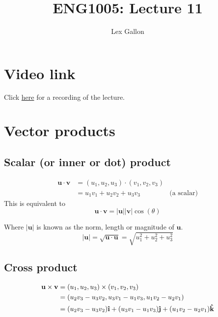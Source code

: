\documentclass[11pt]{article}
\newcommand{\ihat}{\boldsymbol{\hat{\textbf{\i}}}}
\newcommand{\jhat}{\boldsymbol{\hat{\textbf{\j}}}}
\newcommand{\khat}{\boldsymbol{\hat{\textbf{k}}}}
\renewcommand{\vec}[1]{\mathbf{#1}}
\begin{document}
\title{ENG1005: Lecture 11}
\author{Lex Gallon}
\maketitle

\tableofcontents

\section*{Video link}
Click \href{https://echo360.org.au/lesson/G_32340f5d-ff38-43d2-be9d-d88ddb1b3611_b944cecf-8ba5-40d3-a870-0243a0a9e78c_2020-04-08T14:58:00.000_2020-04-08T15:53:00.000/classroom#sortDirection=desc}{here} for a recording of the lecture.

\section{Vector products}
\subsection{Scalar (or inner or dot) product}
\begin{align*}
\vec{u} \cdot \vec{v} &= (u_1, u_2, u_3) \cdot (v_1, v_2, v_3) \\
&= u_1v_1 + u_2v_2 + u_3v_3 & \text{(a scalar)}
\end{align*}
This is equivalent to
\[ \vec{u} \cdot \vec{v} = |\vec{u}||\vec{v}| \cos(\theta) \]

Where $|\vec{u}|$ is known as the norm, length or magnitude of $\vec{u}$.
\[ |\vec{u}| = \sqrt{\vec{u} \cdot \vec{u}} = \sqrt{u_1^2 + u_2^2 + u_3^2} \]

\subsection{Cross product}
\begin{align*}
\vec{u} \times \vec{v} &= (u_1, u_2, u_3) \times (v_1, v_2, v_3) \\
&= (u_2v_3 - u_3v_2, u_3v_1 - u_1v_3, u_1v_2 - u_2v_1) \\ 
&= (u_2v_3 - u_3v_2)\ihat + (u_3v_1 - u_1v_3)\jhat + (u_1v_2 - u_2v_1)\khat
\end{align*}
\end{document}
